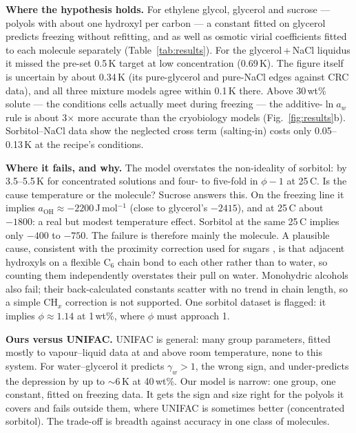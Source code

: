 \documentclass[10pt,a4paper]{article}
\newcommand{\aoh}{a_{\mathrm{OH}}}
\begin{document}
\textbf{Where the hypothesis holds.} For ethylene glycol, glycerol and sucrose --- polyols with about one
hydroxyl per carbon --- a constant fitted on glycerol predicts freezing without refitting, and as well as
osmotic virial coefficients fitted to each molecule separately (Table~\ref{tab:results}). For the
glycerol\,+\,NaCl liquidus it missed the pre-set 0.5\,K target at low concentration (0.69\,K). The figure itself
is uncertain by about 0.34\,K (its pure-glycerol and pure-NaCl edges against CRC data), and all three
mixture models agree within 0.1\,K there. Above 30\,wt\% solute --- the conditions cells actually meet during
freezing --- the additive-$\ln a_w$ rule is about 3$\times$ more accurate than the cryobiology models
(Fig.~\ref{fig:results}b). Sorbitol--NaCl data \cite{bower} show the neglected cross term (salting-in) costs
only 0.05--0.13\,K at the recipe's conditions.

\textbf{Where it fails, and why.} The model overstates the non-ideality of sorbitol: by 3.5--5.5\,K for
concentrated solutions and four- to five-fold in $\phi-1$ at 25\,\textdegree C. Is the cause temperature or the molecule? Sucrose answers this. On the freezing line it implies $\aoh \approx -2200$\,J\,mol$^{-1}$
(close to glycerol's $-2415$), and at 25\,\textdegree C about $-1800$: a real but modest temperature effect.
Sorbitol at the same 25\,\textdegree C implies only $-400$ to $-750$. The failure is therefore mainly the
molecule. A plausible cause, consistent with the proximity correction used for sugars \cite{peres}, is that adjacent hydroxyls on a flexible C$_6$ chain bond to each other rather
than to water, so counting them independently overstates their pull on water. Monohydric alcohols also fail;
their back-calculated constants scatter with no trend in chain length, so a simple CH$_x$ correction is not
supported. One sorbitol dataset \cite{baer} is flagged: it implies $\phi\approx1.14$ at 1\,wt\%, where $\phi$ must approach 1.

\textbf{Ours versus UNIFAC.} UNIFAC is general: many group parameters, fitted mostly to vapour--liquid data
at and above room temperature, none to this system. For water--glycerol it predicts $\gamma_w>1$, the wrong
sign, and under-predicts the depression by up to $\sim$6\,K at 40\,wt\%. Our model is narrow: one group, one
constant, fitted on freezing data. It gets the sign and size right for the polyols it covers and fails outside
them, where UNIFAC is sometimes better (concentrated sorbitol). The trade-off is breadth against accuracy
in one class of molecules.
\end{document}
